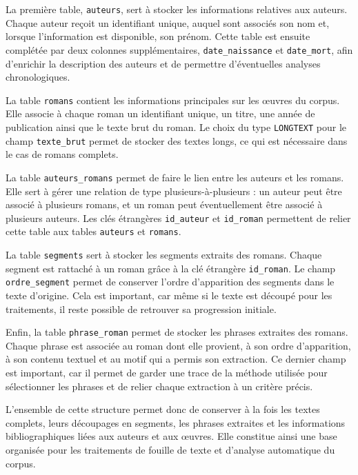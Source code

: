 La première table, \texttt{auteurs}, sert à stocker les informations relatives aux auteurs. Chaque auteur reçoit un identifiant unique, auquel sont associés son nom et, lorsque l'information est disponible, son prénom. Cette table est ensuite complétée par deux colonnes supplémentaires, \texttt{date\_naissance} et \texttt{date\_mort}, afin d'enrichir la description des auteurs et de permettre d'éventuelles analyses chronologiques.

La table \texttt{romans} contient les informations principales sur les œuvres du corpus. Elle associe à chaque roman un identifiant unique, un titre, une année de publication ainsi que le texte brut du roman. Le choix du type \texttt{LONGTEXT} pour le champ \texttt{texte\_brut} permet de stocker des textes longs, ce qui est nécessaire dans le cas de romans complets.

La table \texttt{auteurs\_romans} permet de faire le lien entre les auteurs et les romans. Elle sert à gérer une relation de type plusieurs-à-plusieurs : un auteur peut être associé à plusieurs romans, et un roman peut éventuellement être associé à plusieurs auteurs. Les clés étrangères \texttt{id\_auteur} et \texttt{id\_roman} permettent de relier cette table aux tables \texttt{auteurs} et \texttt{romans}.

La table \texttt{segments} sert à stocker les segments extraits des romans. Chaque segment est rattaché à un roman grâce à la clé étrangère \texttt{id\_roman}. Le champ \texttt{ordre\_segment} permet de conserver l'ordre d'apparition des segments dans le texte d'origine. Cela est important, car même si le texte est découpé pour les traitements, il reste possible de retrouver sa progression initiale.

Enfin, la table \texttt{phrase\_roman} permet de stocker les phrases extraites des romans. Chaque phrase est associée au roman dont elle provient, à son ordre d'apparition, à son contenu textuel et au motif qui a permis son extraction. Ce dernier champ est important, car il permet de garder une trace de la méthode utilisée pour sélectionner les phrases et de relier chaque extraction à un critère précis.

L'ensemble de cette structure permet donc de conserver à la fois les textes complets, leurs découpages en segments, les phrases extraites et les informations bibliographiques liées aux auteurs et aux œuvres. Elle constitue ainsi une base organisée pour les traitements de fouille de texte et d'analyse automatique du corpus.
